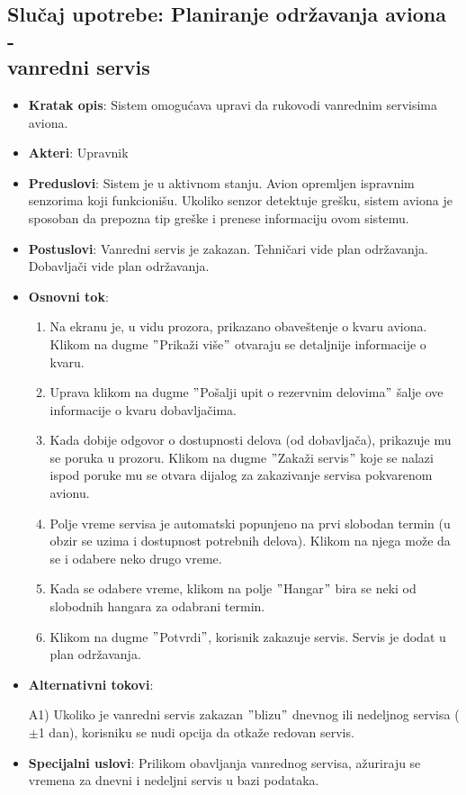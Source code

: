 \documentclass[a4paper]{article}
\begin{document}
\subsection{Slučaj upotrebe: Planiranje održavanja aviona - \\vanredni servis}
\label{subsec:vanredni_servis}
\begin{itemize}
    \item \textbf{Kratak opis}: Sistem omogućava upravi da rukovodi vanrednim servisima aviona.
    \item \textbf{Akteri}: Upravnik
    \item \textbf{Preduslovi}: Sistem je u aktivnom stanju. Avion opremljen ispravnim senzorima koji funkcionišu. Ukoliko senzor detektuje grešku, sistem aviona je sposoban da prepozna tip greške i prenese informaciju ovom sistemu.
    \item \textbf{Postuslovi}: Vanredni servis je zakazan. Tehničari vide plan održavanja. Dobavljači vide plan održavanja.
    \item \textbf{Osnovni tok}:
    \begin{enumerate}
        \item Na ekranu je, u vidu prozora, prikazano obaveštenje o kvaru aviona. Klikom na dugme $"$Prikaži više$"$ otvaraju se detaljnije informacije o kvaru.
        \item Uprava klikom na dugme $"$Pošalji upit o rezervnim delovima$"$ šalje ove informacije o kvaru dobavljačima.
        \item Kada dobije odgovor o dostupnosti delova (od dobavljača), prikazuje mu se poruka u prozoru. Klikom na dugme $"$Zakaži servis$"$ koje se nalazi ispod poruke mu se otvara dijalog za zakazivanje servisa pokvarenom avionu.
        \item Polje vreme servisa je automatski popunjeno na prvi slobodan termin (u obzir se uzima i dostupnost potrebnih delova). Klikom na njega može da se i odabere neko drugo vreme.
        \item Kada se odabere vreme, klikom na polje $"$Hangar$"$ bira se neki od slobodnih hangara za odabrani termin.
        \item Klikom na dugme $"$Potvrdi$"$, korisnik zakazuje servis. Servis je dodat u plan održavanja.
    \end{enumerate}
    
    \item \textbf{Alternativni tokovi}:
        \begin{enumerate}
            A1) Ukoliko je vanredni servis zakazan $"$blizu$"$ dnevnog ili nedeljnog servisa ($\pm$1 dan), korisniku se nudi opcija da otkaže redovan servis.
        \end{enumerate}
    \item \textbf{Specijalni uslovi}: Prilikom obavljanja vanrednog servisa, ažuriraju se vremena za dnevni i nedeljni servis u bazi podataka.
\end{itemize}
\end{document}
